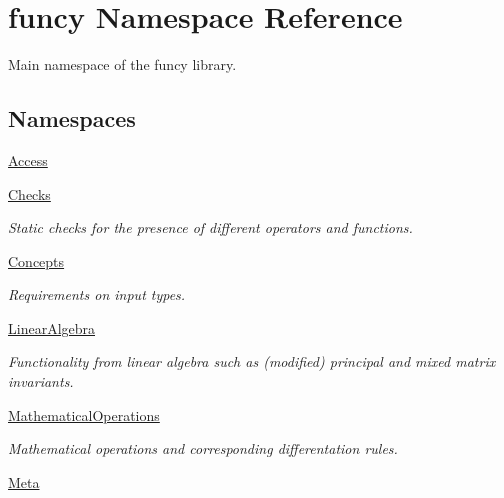 \hypertarget{namespacefuncy}{\section{funcy Namespace Reference}
\label{namespacefuncy}
}


Main namespace of the funcy library.  


\subsection*{Namespaces}
\begin{DoxyCompactItemize}
\item 
\hyperlink{namespacefuncy_1_1Access}{Access}
\item 
\hyperlink{namespacefuncy_1_1Checks}{Checks}
\begin{DoxyCompactList}\small\item\em Static checks for the presence of different operators and functions. \end{DoxyCompactList}\item 
\hyperlink{namespacefuncy_1_1Concepts}{Concepts}
\begin{DoxyCompactList}\small\item\em Requirements on input types. \end{DoxyCompactList}\item 
\hyperlink{namespacefuncy_1_1LinearAlgebra}{Linear\-Algebra}
\begin{DoxyCompactList}\small\item\em Functionality from linear algebra such as (modified) principal and mixed matrix invariants. \end{DoxyCompactList}\item 
\hyperlink{namespacefuncy_1_1MathematicalOperations}{Mathematical\-Operations}
\begin{DoxyCompactList}\small\item\em Mathematical operations and corresponding differentation rules. \end{DoxyCompactList}\item 
\hyperlink{namespacefuncy_1_1Meta}{Meta}
\end{DoxyCompactItemize}
